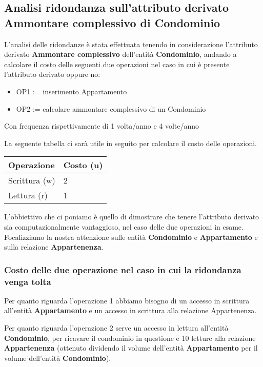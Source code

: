 \subsection{Analisi ridondanza sull'attributo derivato Ammontare complessivo di Condominio}

L'analisi delle ridondanze è stata effettuata tenendo in considerazione l'attributo derivato \textbf{Ammontare complessivo} dell'entità \textbf{Condominio}, andando a calcolare il costo delle seguenti due operazioni nel caso in cui è presente l'attributo derivato oppure no:

\begin{samepage}
	\begin{itemize}
		\item OP1 := inserimento Appartamento
		\item OP2 := calcolare ammontare complessivo di un Condominio
	\end{itemize}
\end{samepage}

Con frequenza rispettivamente di 1 volta/anno e 4 volte/anno

La seguente tabella ci sarà utile in seguito per calcolare il costo delle operazioni.

\bigskip

\begin{tabular}{|l|l|}
	\hline
	Operazione & Costo (u) \\ \hline
	Scrittura (w) & 2 \\ \hline
	Lettura (r) & 1 \\ \hline
\end{tabular}

\bigskip

L'obbiettivo che ci poniamo è quello di dimostrare che tenere l'attributo derivato sia computazionalmente vantaggioso, nel caso delle due operazioni in esame. Focalizziamo la nostra attenzione sulle entità \textbf{Condominio} e \textbf{Appartamento} e sulla relazione \textbf{Appartenenza}.

\subsubsection{Costo delle due operazione nel caso in cui la ridondanza venga tolta}

Per quanto riguarda l'operazione 1 abbiamo bisogno di un accesso in scrittura all'entità \textbf{Appartamento} e un accesso in scrittura alla relazione Appartenenza.

Per quanto riguarda l'operazione 2 serve un accesso in lettura all'entità \textbf{Condominio}, per ricavare il condominio in questione e 10 letture alla relazione \textbf{Appartenenza} (ottenuto dividendo il volume dell'entità \textbf{Appartamento} per il volume dell'entità \textbf{Condominio}).

